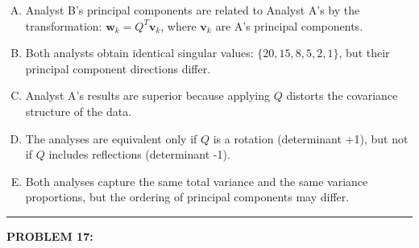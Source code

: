 \documentclass[12pt]{amsart}
\newcommand{\divider}{
  \vspace{-1em} %
  \noindent
  \raisebox{-0.15ex}{\textbullet}%
  \hspace{0.5em}%
  \rule[0.5ex]{0.95\textwidth}{1.0pt}%
  \hspace{0.5em}%
  \raisebox{-0.15ex}{\textbullet}%
  \vspace{0em} %
}
\begin{document}
\begin{enumerate}[(A)]
\item Analyst B's principal components are related to Analyst A's by the transformation: $\mathbf{w}_k = Q^T\mathbf{v}_k$, where $\mathbf{v}_k$ are A's principal components.
\item Both analysts obtain identical singular values: $\{20, 15, 8, 5, 2, 1\}$, but their principal component directions differ.
\item Analyst A's results are superior because applying $Q$ distorts the covariance structure of the data.
\item The analyses are equivalent only if $Q$ is a rotation (determinant +1), but not if $Q$ includes reflections (determinant -1).
\item Both analyses capture the same total variance and the same variance proportions, but the ordering of principal components may differ.
\end{enumerate}


\divider


{\bf PROBLEM 17:}
\end{document}
